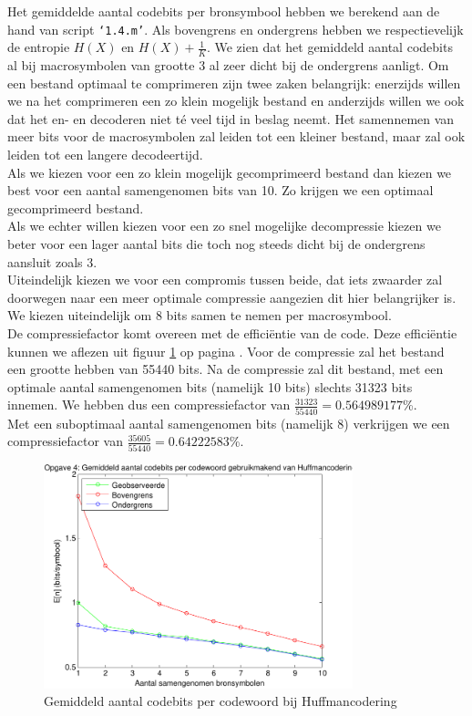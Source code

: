 \documentclass[11pt,a4paper]{article}
\begin{document}
Het gemiddelde aantal codebits per bronsymbool hebben we berekend aan de hand van script \texttt{`1.4.m'}. Als bovengrens en ondergrens hebben we respectievelijk de entropie $H(X)$ en $H(X)+\frac{1}{K}$. We zien dat het gemiddeld aantal codebits al bij macrosymbolen van grootte 3 al zeer dicht bij de ondergrens aanligt. Om een bestand optimaal te comprimeren zijn twee zaken belangrijk: enerzijds willen we na het comprimeren een zo klein mogelijk bestand en anderzijds willen we ook dat het en- en decoderen niet t\'e veel tijd in beslag neemt. Het samennemen van meer bits voor de macrosymbolen zal leiden tot een kleiner bestand, maar zal ook leiden tot een langere decodeertijd.\\
Als we kiezen voor een zo klein mogelijk gecomprimeerd bestand dan kiezen we best voor een aantal samengenomen bits van 10. Zo krijgen we een optimaal gecomprimeerd bestand.\\
Als we echter willen kiezen voor een zo snel mogelijke decompressie kiezen we beter voor een lager aantal bits die toch nog steeds dicht bij de ondergrens aansluit zoals 3.\\
Uiteindelijk kiezen we voor een compromis tussen beide, dat iets zwaarder zal doorwegen naar een meer optimale compressie aangezien dit hier belangrijker is. We kiezen uiteindelijk om 8 bits samen te nemen per macrosymbool.\\

De compressiefactor komt overeen met de effici\"entie van de code. Deze effici\"entie kunnen we aflezen uit figuur \ref{fig:1.4_E} op pagina \pageref{fig:1.4_E}. Voor de compressie zal het bestand een grootte hebben van 55440 bits. Na de compressie zal dit bestand, met een optimale aantal samengenomen bits (namelijk 10 bits) slechts 31323 bits innemen.  We hebben dus een compressiefactor van $\frac{31323}{55440} = 0.564989177$\%.\\
Met een suboptimaal aantal samengenomen bits (namelijk 8) verkrijgen we een compressiefactor van $\frac{35605}{55440} = 0.64222583$\%.

\begin{figure}[h!]
  		\centering
   		\includegraphics[width=0.8\textwidth]{1_4_E.pdf}
  		\caption{Gemiddeld aantal codebits per codewoord bij Huffmancodering}
  		\label{fig:1.4_E}
\end{figure}
\end{document}
